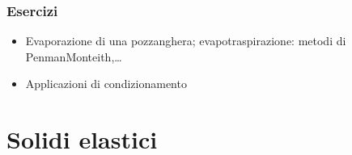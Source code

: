\documentclass[letterpaper,10pt,italian]{jupyterBook}
\begin{document}
\subsubsection{Esercizi}
\label{\detokenize{ch/thermodynamics/humid-air:esercizi}}\begin{itemize}
\item {} 
\sphinxAtStartPar
Evaporazione di una pozzanghera; evapo\sphinxhyphen{}traspirazione: metodi di Penman\sphinxhyphen{}Monteith,…

\item {} 
\sphinxAtStartPar
Applicazioni di condizionamento

\end{itemize}

\sphinxstepscope


\section{Solidi elastici}
\label{\detokenize{ch/thermodynamics/elastic-solid-1d:solidi-elastici}}\label{\detokenize{ch/thermodynamics/elastic-solid-1d:physics-hs-thermodynamics-matter-elastic-1d}}\label{\detokenize{ch/thermodynamics/elastic-solid-1d::doc}}
\end{document}
